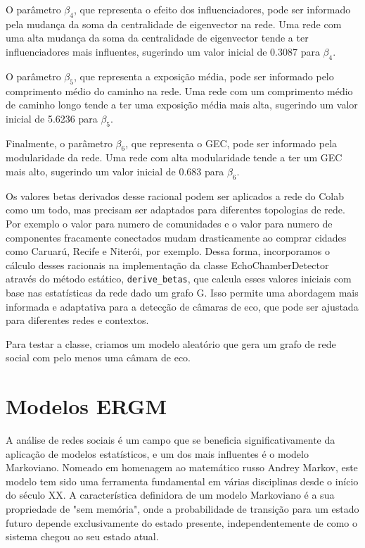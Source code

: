 O parâmetro $\beta_4$, que representa o efeito dos influenciadores, pode ser informado pela mudança da soma da centralidade de eigenvector na rede. Uma rede com uma alta mudança da soma da centralidade de eigenvector tende a ter influenciadores mais influentes, sugerindo um valor inicial de 0.3087 para $\beta_4$.

O parâmetro $\beta_5$, que representa a exposição média, pode ser informado pelo comprimento médio do caminho na rede. Uma rede com um comprimento médio de caminho longo tende a ter uma exposição média mais alta, sugerindo um valor inicial de 5.6236 para $\beta_5$.

Finalmente, o parâmetro $\beta_6$, que representa o GEC, pode ser informado pela modularidade da rede. Uma rede com alta modularidade tende a ter um GEC mais alto, sugerindo um valor inicial de 0.683 para $\beta_6$.

Os valores betas derivados desse racional podem ser aplicados a rede do Colab como um todo, mas precisam ser adaptados para diferentes topologias de rede. Por exemplo o valor para numero de comunidades e o valor para numero de componentes fracamente conectados mudam drasticamente ao comprar cidades como Caruarú, Recife e Niterói, por exemplo. Dessa forma, incorporamos o cálculo desses racionais na implementação da classe EchoChamberDetector através do método estático, \texttt{derive\_betas}, que calcula esses valores iniciais com base nas estatísticas da rede dado um grafo G. Isso permite uma abordagem mais informada e adaptativa para a detecção de câmaras de eco, que pode ser ajustada para diferentes redes e contextos.

Para testar a classe, criamos um modelo aleatório que gera um grafo de rede social com pelo menos uma câmara de eco.

\section{Modelos ERGM}

A análise de redes sociais é um campo que se beneficia significativamente da aplicação de modelos estatísticos, e um dos mais influentes é o modelo Markoviano. Nomeado em homenagem ao matemático russo Andrey Markov, este modelo tem sido uma ferramenta fundamental em várias disciplinas desde o início do século XX. A característica definidora de um modelo Markoviano é a sua propriedade de "sem memória", onde a probabilidade de transição para um estado futuro depende exclusivamente do estado presente, independentemente de como o sistema chegou ao seu estado atual.

